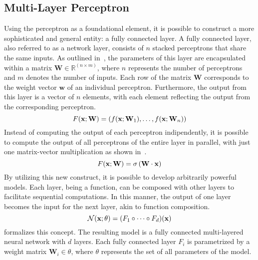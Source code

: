 \subsection{Multi-Layer Perceptron}
Using the perceptron as a foundational element, it is possible to construct a
more sophisticated and general entity: a fully connected layer. A fully
connected layer, also referred to as a network layer, consists of $n$ stacked
perceptrons that share the same inputs. As outlined in~, the
parameters of this layer are encapsulated within a matrix $\mathbf{W} \in
\mathbb{R}^{(n \times m)}$, where $n$ represents the number of perceptrons and
$m$ denotes the number of inputs. Each row of the matrix $\mathbf{W}$ corresponds
to the weight vector $\mathbf{w}$ of an individual perceptron. Furthermore, the
output from this layer is a vector of $n$ elements, with each element reflecting
the output from the corresponding perceptron.
\begin{equation}
  \labeq{2_15}
  F(\mathbf{x}; \mathbf{W}) = (f(\mathbf{x}; \mathbf{W}_1), \dots, f(\mathbf{x}; \mathbf{W}_n))
\end{equation}
Instead of computing the output of each perceptron indipendently, it is possible
to compute the output of all perceptrons of the entire layer in parallel, with
just one matrix-vector multiplication as shown in~.
\begin{equation}
    \labeq{2_16}
    F(\mathbf{x}; \mathbf{W}) = \sigma \left( \mathbf{W} \cdot \mathbf{x} \right )
\end{equation}
By utilizing this new construct, it is possible to develop arbitrarily powerful
models. Each layer, being a function, can be composed with other layers to
facilitate sequential computations. In this manner, the output of one layer
becomes the input for the next layer, akin to function composition. 
\begin{equation}
    \labeq{2_17}
    \mathcal{N}(\mathbf{x}; \theta) = (F_1 \circ \dots \circ F_d)(\mathbf{x})
\end{equation}
 formalizes this concept. The resulting model is a fully connected
multi-layered neural network with $d$ layers. Each fully connected layer $F_i$
is parametrized by a weight matrix $\mathbf{W}_i \in \theta$, where $\theta$
represents the set of all parameters of the model.

